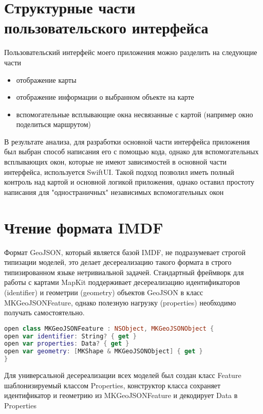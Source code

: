   \section{Структурные части пользовательского интерфейса}
    Пользовательский интерфейс моего приложения можно разделить на следующие части
    \begin{itemize}
      \item отображение карты
      \item отображение информации о выбранном объекте на карте
      \item вспомогательные всплывающие окна несвязанные с картой (например окно поделиться маршрутом)
    \end{itemize}

    В результате анализа, для разработки основной части интерфейса приложения был выбран способ написания его с помощью кода, однако для вспомогательных всплывающих окон, которые не имеют зависимостей в основной части интерфейса, используется SwiftUI. Такой подход позволил иметь полный контроль над картой и основной логикой приложения, однако оставил простоту написания для "одностраничных" независимых вспомогательных окон


  \section{Чтение формата IMDF}
    Формат GeoJSON, который является базой IMDF, не подразумевает строгой типизации моделей, это делает десереализацию такого формата в строго типизированном языке нетривиальной задачей. Стандартный фреймворк для работы с картами MapKit поддерживает десереализацию идентификаторов (identifier) и геометрии (geometry) объектов GeoJSON в класс MKGeoJSONFeature, однако полезную нагрузку (properties) необходимо получать самостоятельно.

    \begin{lstlisting}[language=swift,caption={Интерфейс объекта MKGeoJSONFeature}]
open class MKGeoJSONFeature : NSObject, MKGeoJSONObject {
open var identifier: String? { get }
open var properties: Data? { get }
open var geometry: [MKShape & MKGeoJSONObject] { get }
}
  \end{lstlisting}

    Для универсальной десереализации всех моделей был создан класс Feature шаблонизируемый классом Properties, конструктор класса сохраняет идентификатор и геометрию из MKGeoJSONFeature и декодирует Data в Properties

